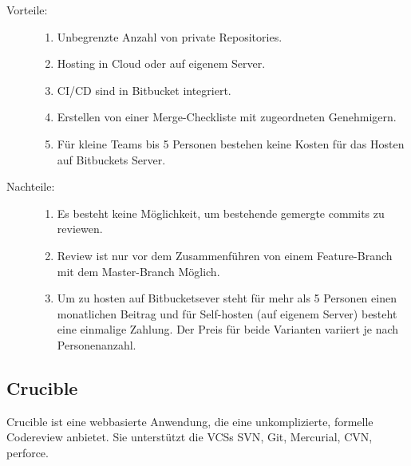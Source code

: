 \begin{description}
	\item [Vorteile:] \hfill
	\begin{enumerate}
		\item Unbegrenzte Anzahl von private Repositories.
		\item Hosting in Cloud oder auf eigenem Server.
		\item \ac{CI}/\ac{CD} sind in Bitbucket integriert.
		\item Erstellen von einer Merge-Checkliste mit zugeordneten Genehmigern.
		\item Für kleine Teams bis 5 Personen bestehen keine Kosten für das Hosten auf Bitbuckets Server.
	\end{enumerate}
	
	\item [Nachteile:] \hfill
	\begin{enumerate}
		\item Es besteht keine Möglichkeit, um bestehende gemergte commits zu reviewen.
		\item Review ist nur vor dem Zusammenführen von einem Feature-Branch mit dem Master-Branch Möglich.
		\item Um zu hosten auf Bitbucketsever steht für mehr als 5 Personen einen monatlichen Beitrag und für Self-hosten (auf eigenem Server) besteht eine einmalige Zahlung. Der 
			Preis für beide Varianten variiert je nach Personenanzahl.
	\end{enumerate}
\end{description}

\subsection{Crucible}
\label{subsec:Crucible}

Crucible ist eine webbasierte Anwendung, die eine unkomplizierte, formelle Codereview anbietet. Sie unterstützt die \acp{VCS} \ac{SVN}, Git, Mercurial, \ac{CVN}, perforce.

